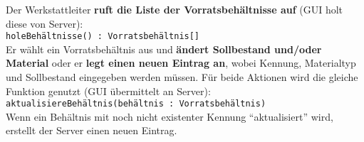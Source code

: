 Der Werkstattleiter \textbf{ruft die Liste der Vorratsbehältnisse auf} (GUI holt diese von Server):\\
\medskip
\texttt{holeBehältnisse() : Vorratsbehältnis[]}
\\\medskip
Er wählt ein Vorratsbehältnis aus und \textbf{ändert Sollbestand und/oder Material} oder er \textbf{legt einen neuen Eintrag an}, wobei Kennung, Materialtyp und Sollbestand eingegeben werden müssen.
Für beide Aktionen wird die gleiche Funktion genutzt (GUI übermittelt an Server):\\

\texttt{aktualisiereBehältnis(behältnis : Vorratsbehältnis)}\\

Wenn ein Behältnis mit noch nicht existenter Kennung "`aktualisiert"' wird, erstellt der Server einen neuen Eintrag.